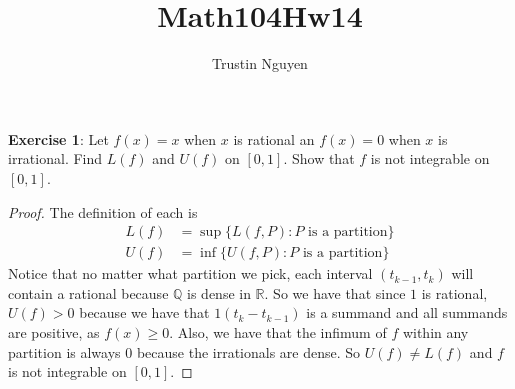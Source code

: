 \documentclass{article}
\title{Math104Hw14}
\author{Trustin Nguyen}
\begin{document}
    \maketitle

\reversemarginpar

\textbf{Exercise 1}: Let $f(x) = x$ when $x$ is rational an $f(x) = 0$ when $x$ is irrational. Find $L(f)$ and $U(f)$ on $[0, 1]$. Show that $f$ is not integrable on $[0, 1]$.
    \begin{proof}
        The definition of each is 
            \begin{align*}
                L(f) &= \sup\{L(f, P) : \text{$P$ is a partition}\} \\
                U(f) &= \inf\{U(f, P) : \text{$P$ is a partition}\}   
            \end{align*}
        Notice that no matter what partition we pick, each interval $(t_{k - 1}, t_{k})$ will contain a rational because $\mathbb{Q}$ is dense in $\mathbb{R}$. So we have that since $1$ is rational, $U(f) > 0$ because we have that $1(t_{k} - t_{k - 1})$ is a summand and all summands are positive, as $f(x) \geq 0$. Also, we have that the infimum of $f$ within any partition is always $0$ because the irrationals are dense. So $U(f) \neq L(f)$ and $f$ is not integrable on $[0, 1]$.
    \end{proof}
\end{document}
